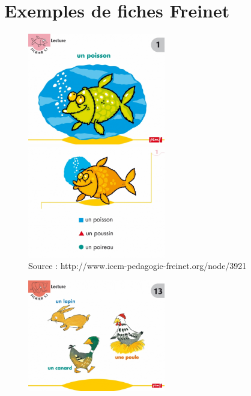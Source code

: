 \section{Exemples de fiches Freinet}
\label{annexeFreinet}
\begin{center}
\begin{figure}[h]
   \begin{minipage}[c]{.46\linewidth}
      \includegraphics[width=6cm]{img/GSCP_f1recto.jpg}
   \end{minipage}  
   \begin{minipage}[c]{.46\linewidth}
      \includegraphics[width=6cm]{img/GSCP_f1verso.jpg}
   \end{minipage}
   \caption{Source : http://www.icem-pedagogie-freinet.org/node/3921}
\end{figure}
\vline
\vline
\begin{figure}[h]
   \begin{minipage}[c]{.46\linewidth}
      \includegraphics[width=6cm]{img/CP_niv2_f13recto.jpg}
   \end{minipage}  
   \begin{minipage}[c]{.46\linewidth}

\end{minipage}
\end{figure}
\end{center}
